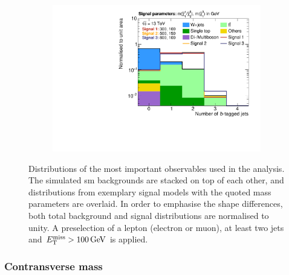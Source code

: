 \begin{figure}
\begin{subfigure}[b]{0.49\linewidth}
		\centering\includegraphics[width=\textwidth]{presel/nBJet}
		\caption{\label{fig:norm_nbjet}}
	\end{subfigure}
	\caption{Distributions of the most important observables used in the analysis. The simulated \gls{sm} backgrounds are stacked on top of each other, and distributions from exemplary signal models with the quoted mass parameters are overlaid. In order to emphasise the shape differences, both total background and signal distributions are normalised to unity. A preselection of a lepton (electron or muon), at least two jets and $\etmiss > \SI{100}{\GeV}$ is applied.}\label{fig:norm_obs}
\end{figure}

\subsubsection{Contransverse mass}

